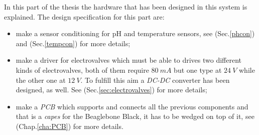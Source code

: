 In this part of the thesis the hardware that has been designed in this system is explained. 
The design specification for this part are:
\begin{itemize}
	\item make a sensor conditioning for pH and temperature sensors, see (Sec.\ref{phcon}) and (Sec.\ref{tempcon}) for more details;
	\item make a driver for electrovalves which must be able to drives two different kinds of electrovalves, both of them require $80\ mA$ but one type at $24\ V$ while the other one at $12\ V$. To fulfill this aim a \textit{DC-DC} converter has been designed, as well. See (Sec.\ref{sec:electrovalves}) for more details;
	\item make a \textit{PCB}  which supports and connects all the previous components and that is a \textit{capes} for the Beaglebone Black,  it has to be wedged on top of it, see (Chap.\ref{cha:PCB}) for more details.
\end{itemize}